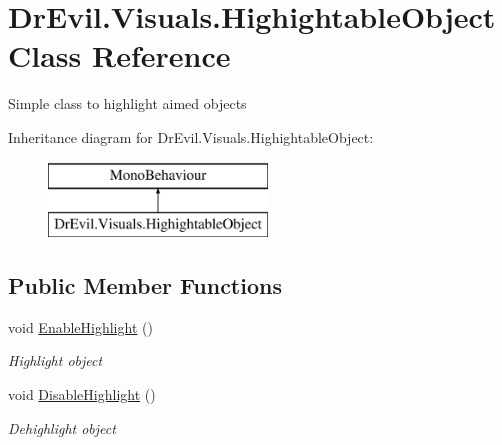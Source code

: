 \hypertarget{class_dr_evil_1_1_visuals_1_1_highightable_object}{}\section{Dr\+Evil.\+Visuals.\+Highightable\+Object Class Reference}
\label{class_dr_evil_1_1_visuals_1_1_highightable_object}


Simple class to highlight aimed objects  


Inheritance diagram for Dr\+Evil.\+Visuals.\+Highightable\+Object\+:\begin{figure}[H]
\begin{center}
\leavevmode
\includegraphics[height=2.000000cm]{class_dr_evil_1_1_visuals_1_1_highightable_object}
\end{center}
\end{figure}
\subsection*{Public Member Functions}
\begin{DoxyCompactItemize}
\item 
void \mbox{\hyperlink{class_dr_evil_1_1_visuals_1_1_highightable_object_aaade7ada66cdac85e38045579c4cb447}{Enable\+Highlight}} ()
\begin{DoxyCompactList}\small\item\em Highlight object \end{DoxyCompactList}\item 
void \mbox{\hyperlink{class_dr_evil_1_1_visuals_1_1_highightable_object_a6b59e8e3ac556d65eb93a304be07c18f}{Disable\+Highlight}} ()
\begin{DoxyCompactList}\small\item\em Dehighlight object \end{DoxyCompactList}\end{DoxyCompactItemize}
